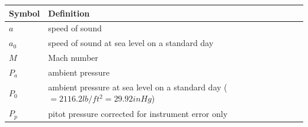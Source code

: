 \documentclass[
]{book}
\begin{document}
\begin{longtable}[]{@{}ll@{}}
\toprule
\begin{minipage}[b]{0.22\columnwidth}\raggedright
Symbol\strut
\end{minipage} & \begin{minipage}[b]{0.72\columnwidth}\raggedright
Definition\strut
\end{minipage}\tabularnewline
\midrule
\endhead
\begin{minipage}[t]{0.22\columnwidth}\raggedright
\(a\)\strut
\end{minipage} & \begin{minipage}[t]{0.72\columnwidth}\raggedright
speed of sound\strut
\end{minipage}\tabularnewline
\begin{minipage}[t]{0.22\columnwidth}\raggedright
\(a_0\)\strut
\end{minipage} & \begin{minipage}[t]{0.72\columnwidth}\raggedright
speed of sound at sea level on a standard day\strut
\end{minipage}\tabularnewline
\begin{minipage}[t]{0.22\columnwidth}\raggedright
\(M\)\strut
\end{minipage} & \begin{minipage}[t]{0.72\columnwidth}\raggedright
Mach number\strut
\end{minipage}\tabularnewline
\begin{minipage}[t]{0.22\columnwidth}\raggedright
\(P_a\)\strut
\end{minipage} & \begin{minipage}[t]{0.72\columnwidth}\raggedright
ambient pressure\strut
\end{minipage}\tabularnewline
\begin{minipage}[t]{0.22\columnwidth}\raggedright
\(P_0\)\strut
\end{minipage} & \begin{minipage}[t]{0.72\columnwidth}\raggedright
ambient pressure at sea level on a standard day (\(=2116.2 lb/ft^2 = 29.92 in Hg\))\strut
\end{minipage}\tabularnewline
\begin{minipage}[t]{0.22\columnwidth}\raggedright
\(P_p\)\strut
\end{minipage} & \begin{minipage}[t]{0.72\columnwidth}\raggedright
pitot pressure corrected for instrument error only\strut
\end{minipage}\tabularnewline

\end{longtable}
\end{document}
